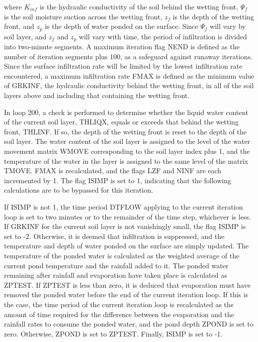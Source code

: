 where $K_{inf}$ is the hydraulic conductivity of the soil behind the wetting front, $\Psi_f$ is the soil moisture suction across the wetting front, $z_f$ is the depth of the wetting front, and $z_p$ is the depth of water ponded on the surface. Since $\Psi_f$ will vary by soil layer, and $z_f$ and $z_p$ will vary with time, the period of infiltration is divided into two-\/minute segments. A maximum iteration flag N\+E\+N\+D is defined as the number of iteration segments plus 100, as a safeguard against runaway iterations. Since the surface infiltration rate will be limited by the lowest infiltration rate encountered, a maximum infiltration rate F\+M\+A\+X is defined as the minimum value of G\+R\+K\+I\+N\+F, the hydraulic conductivity behind the wetting front, in all of the soil layers above and including that containing the wetting front.

In loop 200, a check is performed to determine whether the liquid water content of the current soil layer, T\+H\+L\+I\+Q\+X, equals or exceeds that behind the wetting front, T\+H\+L\+I\+N\+F. If so, the depth of the wetting front is reset to the depth of the soil layer. The water content of the soil layer is assigned to the level of the water movement matrix W\+M\+O\+V\+E corresponding to the soil layer index plus 1, and the temperature of the water in the layer is assigned to the same level of the matrix T\+M\+O\+V\+E. F\+M\+A\+X is recalculated, and the flags L\+Z\+F and N\+I\+N\+F are each incremented by 1. The flag I\+S\+I\+M\+P is set to 1, indicating that the following calculations are to be bypassed for this iteration.

If I\+S\+I\+M\+P is not 1, the time period D\+T\+F\+L\+O\+W applying to the current iteration loop is set to two minutes or to the remainder of the time step, whichever is less. If G\+R\+K\+I\+N\+F for the current soil layer is not vanishingly small, the flag I\+S\+I\+M\+P is set to -\/2. Otherwise, it is deemed that infiltration is suppressed, and the temperature and depth of water ponded on the surface are simply updated. The temperature of the ponded water is calculated as the weighted average of the current pond temperature and the rainfall added to it. The ponded water remaining after rainfall and evaporation have taken place is calculated as Z\+P\+T\+E\+S\+T. If Z\+P\+T\+E\+S\+T is less than zero, it is deduced that evaporation must have removed the ponded water before the end of the current iteration loop. If this is the case, the time period of the current iteration loop is recalculated as the amount of time required for the difference between the evaporation and the rainfall rates to consume the ponded water, and the pond depth Z\+P\+O\+N\+D is set to zero. Otherwise, Z\+P\+O\+N\+D is set to Z\+P\+T\+E\+S\+T. Finally, I\+S\+I\+M\+P is set to -\/1.

